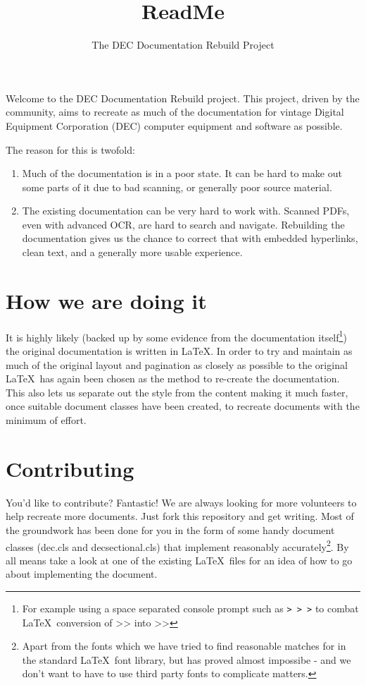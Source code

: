 \documentclass{decsectional}
\title{ReadMe}
\author{The DEC Documentation Rebuild Project}
\begin{document}
\toc
\newpage

\pagestyle{preface}

Welcome to the DEC Documentation Rebuild project.  This project, driven by the community, aims to
recreate as much of the documentation for vintage Digital Equipment Corporation (DEC) computer 
equipment and software as possible.

The reason for this is twofold:

\begin{enumerate}

\item 	Much of the documentation is in a poor state. It can be hard to make out some parts of it due to bad scanning,
		or generally poor source material.

\item	The existing documentation can be very hard to work with. Scanned PDFs, even with advanced OCR, are hard to
		search and navigate. Rebuilding the documentation gives us the chance to correct that with embedded hyperlinks,
		clean text, and a generally more usable experience.

\end{enumerate}

\chapter{How we are doing it}
\pagestyle{main}

It is highly likely (backed up by some evidence from the documentation itself\footnote{For example using a space separated console prompt such as {\tt > > >}
to combat \LaTeX\ conversion of {>}{>} into >> }) the original documentation is written in \LaTeX. In order to try and maintain as much of the original layout and pagination as closely
as possible to the original \LaTeX\ has again been chosen as the method to re-create the documentation. This also lets us separate out the style from the content
making it much faster, once suitable document classes have been created, to recreate documents with the minimum of effort.

\chapter{Contributing}

You'd like to contribute? Fantastic! We are always looking for more volunteers to help recreate more documents. Just fork this repository and get
writing. Most of the groundwork has been done for you in the form of some handy document classes (dec.cls and decsectional.cls) that implement
reasonably accurately\footnote{Apart from the fonts which we have tried to find reasonable matches for in the standard \LaTeX\ font library, but
has proved almost impossibe - and we don't want to have to use third party fonts to complicate matters.}. By all means take a look at one of the
existing \LaTeX\ files for an idea of how to go about implementing the document.
\end{document}
